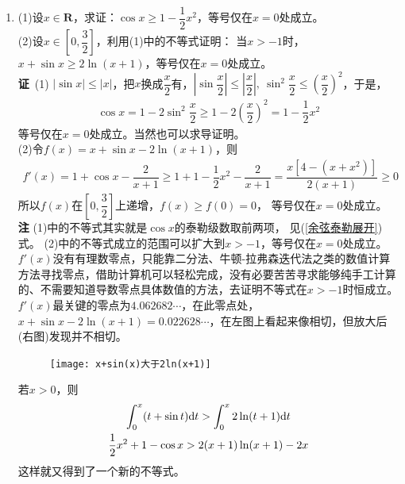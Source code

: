 \begin{enumerate}[label={【\textbf{例\thechapter.\arabic*}】},
 leftmargin=\inteval{\myenumleftmargin}pt,
 itemsep=\inteval{\myenumitempsep}pt,
 itemindent=\inteval{\myenumitemindent}pt]
\item (1)设$ x\in \textbf{R} $，求证：$ \cos x\geq 1-\dfrac{1}{2}x^2 $，等号仅在$ x=0 $处成立。\\
(2)设$ x\in \left[0,\dfrac{3}{2}\right] $，利用(1)中的不等式证明：
当$ x>-1 $时，$ x+\sin x\geq 2\ln(x+1) $，等号仅在$ x=0 $处成立。\\
\textbf{证}\ (1)  $ |\sin x|\leq |x| $，把$ x $换成$ \dfrac{x}{2} $有，$ |\sin\dfrac{x}
{2}|\leq |\dfrac{x}{2}|,\ \sin^2\dfrac{x}{2}\leq (\dfrac{x}{2})^2 $，于是，
\begin{gather*}
 \cos x=1-2\sin^2\dfrac{x}{2}\geq 1-2(\dfrac{x}{2})^2=1-\dfrac{1}{2}x^2
\end{gather*}
等号仅在$ x=0 $处成立。当然也可以求导证明。\\
(2)令$ f(x)=x+\sin x-2\ln(x+1) $，则
\begin{gather*}
    f'(x)=1+\cos x-\dfrac{2}{x+1}\geq 1+1-\dfrac{1}{2}x^2-\dfrac{2}{x+1}
    =\dfrac{x[4-(x+x^2)]}{2(x+1)}\geq 0 
\end{gather*}
所以$ f(x) $在$ \left[0,\dfrac{3}{2}\right] $上递增，$ f(x)\geq f(0)=0 $，
等号仅在$ x=0 $处成立。\\
\textbf{注} (1)中的不等式其实就是$ \cos x $的泰勒级数取前两项，
见(\ref{余弦泰勒展开})式。
(2)中的不等式成立的范围可以扩大到$ x>-1 $，等号仅在$ x=0 $处成立。
$ f'(x) $没有有理数零点，只能靠二分法、牛顿-拉弗森迭代法之类的数值计算方法寻找零点，借助计算机可以轻松完成，没有必要苦苦寻求能够纯手工计算的、不需要知道导数零点具体数值的方法，去证明不等式在$ x>-1 $时恒成立。$ f'(x) $最关键的零点为$ 4.062682\cdots $，在此零点处，$ x+\sin x-2\ln(x+1) = 0.022628\cdots $，在左图上看起来像相切，但放大后(右图)发现并不相切。
\begin{figure}[H]
    \centering
    \texttt{[image: x+sin(x)大于2ln(x+1)]}
\end{figure} 

若$ x>0 $，则
\begin{gather*}
    \int_{0}^{x}(t+\sin t)\mathrm{d} t>\int_{0}^{x}2\ln(t+1)\mathrm{d} t \\
    \dfrac{1}{2}x^2+1-\cos x > 2(x+1)\ln(x+1) -2x
\end{gather*}
这样就又得到了一个新的不等式。


\end{enumerate}
